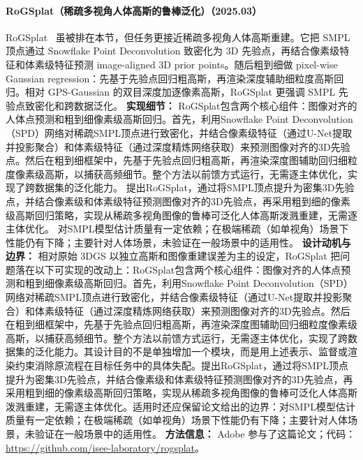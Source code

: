 \paragraph{RoGSplat（稀疏多视角人体高斯的鲁棒泛化）（2025.03）}

RoGSplat~\cite{2503_14198} 虽被排在本节，但任务更接近稀疏多视角人体高斯重建。它把 SMPL 顶点通过 Snowflake Point Deconvolution 致密化为 3D 先验点，再结合像素级特征和体素级特征预测 image-aligned 3D prior points。随后粗到细做 pixel-wise Gaussian regression：先基于先验点回归粗高斯，再渲染深度辅助细粒度高斯回归。相对 GPS-Gaussian 的双目深度加逐像素高斯，RoGSplat 更强调 SMPL 先验点致密化和跨数据泛化。
\textbf{实现细节：} RoGSplat包含两个核心组件：图像对齐的人体点预测和粗到细像素级高斯回归。首先，利用Snowflake Point Deconvolution（SPD）网络对稀疏SMPL顶点进行致密化，并结合像素级特征（通过U-Net提取并投影聚合）和体素级特征（通过深度精炼网络获取）来预测图像对齐的3D先验点。然后在粗到细框架中，先基于先验点回归粗高斯，再渲染深度图辅助回归细粒度像素级高斯，以捕获高频细节。整个方法以前馈方式运行，无需逐主体优化，实现了跨数据集的泛化能力。 提出RoGSplat，通过将SMPL顶点提升为密集3D先验点，并结合像素级和体素级特征预测图像对齐的3D先验点，再采用粗到细的像素级高斯回归策略，实现从稀疏多视角图像的鲁棒可泛化人体高斯泼溅重建，无需逐主体优化。 对SMPL模型估计质量有一定依赖；在极端稀疏（如单视角）场景下性能仍有下降；主要针对人体场景，未验证在一般场景中的适用性。
\textbf{设计动机与边界：} 相对原始 3DGS 以独立高斯和图像重建误差为主的设定，RoGSplat 把问题落在以下可实现的改动上：RoGSplat包含两个核心组件：图像对齐的人体点预测和粗到细像素级高斯回归。首先，利用Snowflake Point Deconvolution（SPD）网络对稀疏SMPL顶点进行致密化，并结合像素级特征（通过U-Net提取并投影聚合）和体素级特征（通过深度精炼网络获取）来预测图像对齐的3D先验点。然后在粗到细框架中，先基于先验点回归粗高斯，再渲染深度图辅助回归细粒度像素级高斯，以捕获高频细节。整个方法以前馈方式运行，无需逐主体优化，实现了跨数据集的泛化能力。其设计目的不是单独增加一个模块，而是用上述表示、监督或渲染约束消除原流程在目标任务中的具体失配。提出RoGSplat，通过将SMPL顶点提升为密集3D先验点，并结合像素级和体素级特征预测图像对齐的3D先验点，再采用粗到细的像素级高斯回归策略，实现从稀疏多视角图像的鲁棒可泛化人体高斯泼溅重建，无需逐主体优化。适用时还应保留论文给出的边界：对SMPL模型估计质量有一定依赖；在极端稀疏（如单视角）场景下性能仍有下降；主要针对人体场景，未验证在一般场景中的适用性。
\textbf{方法信息：} Adobe 参与了这篇论文；代码：\url{https://github.com/isee-laboratory/rogsplat}。



